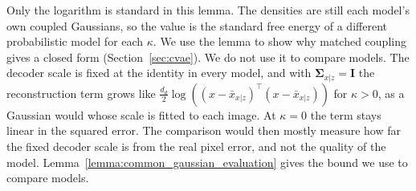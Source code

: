 \documentclass[twoside,11pt]{article}
\begin{document}
Only the logarithm is standard in this lemma. The densities are still each model's own coupled Gaussians, so the value is the standard free energy of a different probabilistic model for each $\kappa$. We use the lemma to show why matched coupling gives a closed form (Section~\ref{sec:cvae}). We do not use it to compare models. The decoder scale is fixed at the identity in every model, and with $\boldsymbol{\Sigma}_{x|z}=\mathbf{I}$ the reconstruction term grows like $\frac{d_d}{2}\log\left(\left(x-\bar{x}_{x|z}\right)^{\intercal}\left(x-\bar{x}_{x|z}\right)\right)$ for $\kappa>0$, as a Gaussian would whose scale is fitted to each image. At $\kappa=0$ the term stays linear in the squared error. The comparison would then mostly measure how far the fixed decoder scale is from the real pixel error, and not the quality of the model. Lemma~\ref{lemma:common_gaussian_evaluation} gives the bound we use to compare models.
\end{document}
